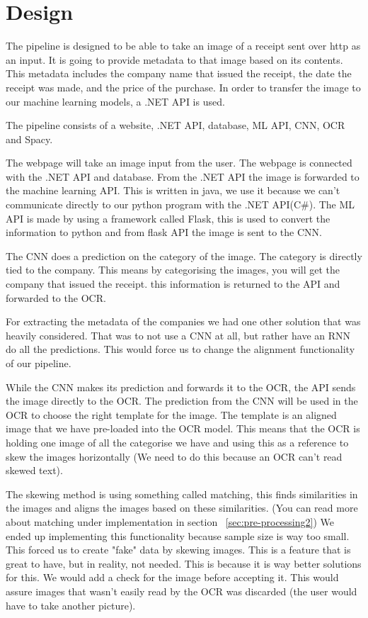 \chapter{Design}
\label{ch:design}

The pipeline is designed to be able to take an image of a receipt sent over http as an input.
It is going to provide metadata to that image based on its contents.
This metadata includes the company name that issued the receipt, the date the receipt was made, and the price of the purchase.
In order to transfer the image to our machine learning models, a .NET API is used.

The pipeline consists of a website, .NET API, database, ML API, CNN, OCR and Spacy.

The webpage will take an image input from the user.
The webpage is connected with the .NET API and database.
From the .NET API the image is forwarded to the machine learning API\@.
This is written in java, we use it because we can't communicate directly to our python program with the .NET API(C#)\@.
The ML API is made by using a framework called Flask, this is used to convert the information to python and from flask API the image is sent to the CNN\@.

The CNN does a prediction on the category of the image.
The category is directly tied to the company.
This means by categorising the images, you will get the company that issued the receipt.
this information is returned to the API and forwarded to the OCR\@.

For extracting the metadata of the companies we had one other solution that was heavily considered.
That was to not use a CNN at all, but rather have an RNN do all the predictions.
This would force us to change the alignment functionality of our pipeline.

While the CNN makes its prediction and forwards it to the OCR, the API sends the image directly to the OCR.
The prediction from the CNN will be used in the OCR to choose the right template for the image.
The template is an aligned image that we have pre-loaded into the OCR model.
This means that the OCR is holding one image of all the categorise we have and using this as a reference to skew the images horizontally (We need to do this because an OCR can't read skewed text).

The skewing method is using something called matching, this finds similarities in the images and aligns the images
based on these similarities. (You can read more about matching under implementation in section ~\ref{sec:pre-processing2})
We ended up implementing this functionality because sample size is way too small.
This forced us to create "fake" data by skewing images.
This is a feature that is great to have, but in reality, not needed.
This is because it is way better solutions for this.
We would add a check for the image before accepting it.
This would assure images that wasn't easily read by the OCR was discarded (the user would have to take another picture).

